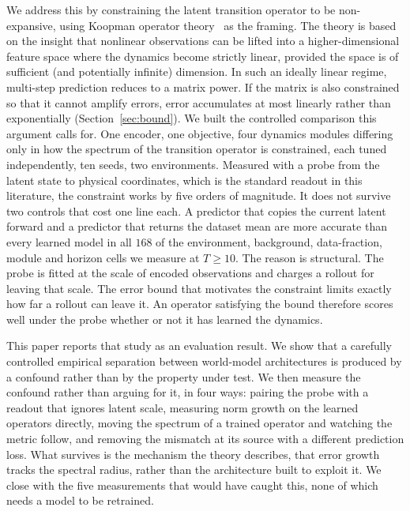 \documentclass[10pt]{article} %
\begin{document}
We address this by constraining the latent transition operator to be non-expansive, using Koopman operator theory~\citep{Koopman1931} as the framing. The theory is based on the insight that nonlinear observations can be lifted into a higher-dimensional feature space where the dynamics become strictly linear, provided the space is of sufficient (and potentially infinite) dimension.
In such an ideally linear regime, multi-step prediction reduces to a matrix power. If the matrix is also constrained so that it cannot amplify errors, error accumulates at most linearly rather than exponentially (Section~\ref{sec:bound}).
We built the controlled comparison this argument calls for. One encoder, one objective, four dynamics modules differing only in how the spectrum of the transition operator is constrained, each tuned independently, ten seeds, two environments. Measured with a probe from the latent state to physical coordinates, which is the standard readout in this literature, the constraint works by five orders of magnitude. It does not survive two controls that cost one line each. A predictor that copies the current latent forward and a predictor that returns the dataset mean are more accurate than every learned model in all $168$ of the environment, background, data-fraction, module and horizon cells we measure at $T \ge 10$. The reason is structural. The probe is fitted at the scale of encoded observations and charges a rollout for leaving that scale. The error bound that motivates the constraint limits exactly how far a rollout can leave it. An operator satisfying the bound therefore scores well under the probe whether or not it has learned the dynamics.

This paper reports that study as an evaluation result. We show that a carefully controlled empirical separation between world-model architectures is produced by a confound rather than by the property under test. We then measure the confound rather than arguing for it, in four ways: pairing the probe with a readout that ignores latent scale, measuring norm growth on the learned operators directly, moving the spectrum of a trained operator and watching the metric follow, and removing the mismatch at its source with a different prediction loss. What survives is the mechanism the theory describes, that error growth tracks the spectral radius, rather than the architecture built to exploit it. We close with the five measurements that would have caught this, none of which needs a model to be retrained.
\end{document}

